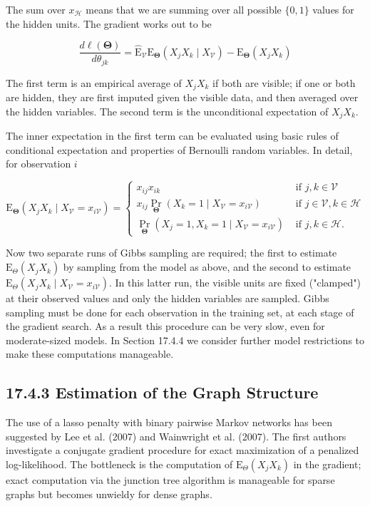 \documentclass[10pt]{article}
\begin{document}
The sum over $x_{\mathcal{H}}$ means that we are summing over all possible $\{0,1\}$ values for the hidden units. The gradient works out to be


\begin{equation*}
\frac{d \ell(\boldsymbol{\Theta})}{d \theta_{j k}}=\hat{\mathrm{E}}_{\mathcal{V}} \mathrm{E}_{\boldsymbol{\Theta}}\left(X_{j} X_{k} \mid X_{\mathcal{V}}\right)-\mathrm{E}_{\boldsymbol{\Theta}}\left(X_{j} X_{k}\right) \tag{17.37}
\end{equation*}


The first term is an empirical average of $X_{j} X_{k}$ if both are visible; if one or both are hidden, they are first imputed given the visible data, and then averaged over the hidden variables. The second term is the unconditional expectation of $X_{j} X_{k}$.

The inner expectation in the first term can be evaluated using basic rules of conditional expectation and properties of Bernoulli random variables. In detail, for observation $i$

$$
\mathrm{E}_{\boldsymbol{\Theta}}\left(X_{j} X_{k} \mid X_{\mathcal{V}}=x_{i \mathcal{V}}\right)= \begin{cases}x_{i j} x_{i k} & \text { if } j, k \in \mathcal{V} \\ x_{i j} \operatorname{Pr}_{\boldsymbol{\Theta}}\left(X_{k}=1 \mid X_{\mathcal{V}}=x_{i \mathcal{V}}\right) & \text { if } j \in \mathcal{V}, k \in \mathcal{H} \\ \operatorname{Pr}_{\boldsymbol{\Theta}}\left(X_{j}=1, X_{k}=1 \mid X_{\mathcal{V}}=x_{i \mathcal{V}}\right) & \text { if } j, k \in \mathcal{H} .\end{cases}
$$

Now two separate runs of Gibbs sampling are required; the first to estimate $\mathrm{E}_{\Theta}\left(X_{j} X_{k}\right)$ by sampling from the model as above, and the second to estimate $\mathrm{E}_{\Theta}\left(X_{j} X_{k} \mid X_{\mathcal{V}}=x_{i \mathcal{V}}\right)$. In this latter run, the visible units are fixed ("clamped") at their observed values and only the hidden variables are sampled. Gibbs sampling must be done for each observation in the training set, at each stage of the gradient search. As a result this procedure can be very slow, even for moderate-sized models. In Section 17.4.4 we consider further model restrictions to make these computations manageable.

\subsection*{17.4.3 Estimation of the Graph Structure}
The use of a lasso penalty with binary pairwise Markov networks has been suggested by Lee et al. (2007) and Wainwright et al. (2007). The first authors investigate a conjugate gradient procedure for exact maximization of a penalized log-likelihood. The bottleneck is the computation of $\mathrm{E}_{\Theta}\left(X_{j} X_{k}\right)$ in the gradient; exact computation via the junction tree algorithm is manageable for sparse graphs but becomes unwieldy for dense graphs.
\end{document}
